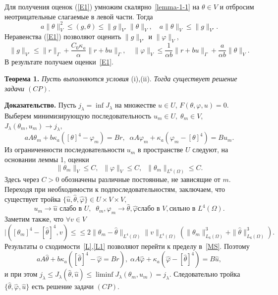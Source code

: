 \documentclass[12pt]{article}
\begin{document}
    Для получения оценок (\ref{E1}) умножим скалярно~\eqref{lemma-1-1} на $\theta \in V$ и отбросим неотрицательные
    слагаемые в левой части.
    Тогда
    $$
    a \|\theta\|^2_V \leq (g, \theta) \leq \|g\|_{V'}\|\theta\|_V,
    \quad a\|\theta\|_V \leq \|g\|_{V'}.
    $$
    Неравенства (\ref{E1}) позволяют оценить $\|g\|_{V'}$ и $\|\varphi\|_V $,
    $$
    \|g\|_{V'} \leq \|r\|_\Gamma + \frac{C_0\kappa_a}{\alpha}\|r + bu\|_\Gamma, \quad
    \|\varphi\|_V \leq \frac{1}{\alpha b} \|r + bu\|_\Gamma + \frac{a}{\alpha b} \|\theta\|_V.
    $$
    В результате получаем оценки~\eqref{E1}.

    \textbf{Теорема 1.}
    {\it
    Пусть выполняются условия} (i),(ii).
        {\it Тогда существует решение задачи $(CP).$
    }

        {\bf Доказательство.}
    Пусть $j_\lambda = \inf J_\lambda$ на множестве $u \in U$, $F(\theta, \varphi, u)=0.$
    Выберем минимизирующую последовательность
    $u_m \in U, \; \theta_m \in V$, $J_\lambda(\theta_m, u_m)
    \rightarrow j_\lambda,$
    \begin{equation}
        \label{MS}
        a A \theta_m +b \kappa_a([\theta]^4 - \varphi_m) = Br, \;\;
        \alpha A \varphi_m + \kappa_a (\varphi_m - [\theta]^4) = B u_m.
    \end{equation}
    Из ограниченности последовательности $u_m$ в пространстве $U$ следуют, на основании
    леммы 1, оценки
    $$
    \|\theta_m\|_V \leq C,\;\;
    \|\varphi\|_V \leq C,\;\;\|\theta_m\|_{L^6(\Omega)} \leq C.
    $$
    Здесь через $C>0$ обозначены различные постоянные, не зависящие от $m$.
    Переходя при необходимости к подпоследовательностям, заключаем, что
    существует тройка $\{ \hat{u}, \hat{\theta}, \hat{\varphi} \} \in U \times V \times V,$
    \begin{equation}
        \label{L}
        u_m \rightarrow \hat{u} \text{  слабо в } U, \;\;
        \theta_m, \varphi_m \rightarrow \hat{\theta}, \hat{\varphi} \text{
            слабо в } V, \text{
            сильно в } L^4(\Omega).
    \end{equation}
    Заметим также, что $\forall v \in V$
    \begin{equation}
        \label{L1}
        |( [\theta_m]^4 - [\hat{\theta}]^4, v) \leq
        \leq 2 \| \theta_m - \hat{\theta}\|_{L^4(\Omega)} \|v\|_{L^4(\Omega)}
        \left( \| \theta_m \|^3_{L_6(\Omega)} + \| \hat{\theta} \|^3_{L_6(\Omega)}\right).
    \end{equation}
    Результаты о сходимости~\eqref{L},\eqref{L1} позволяют перейти
    к пределу в~\eqref{MS}.
    Поэтому
    \[
        a A \hat{\theta} + b \kappa_a ([\hat{\theta}]^4 - \hat{\varphi} = Br), \;
        \alpha A \hat{\varphi} + \kappa_a (\hat{\varphi} -[\hat{\theta}]^4) = B \hat{u},
    \]
    и при этом $j_\lambda \leq J_\lambda(\hat{\theta}, \hat{u}) \leq \liminf J_\lambda(\theta_m, u_m) =
    j_\lambda$.
    Следовательно тройка $\{\hat{\theta}, \hat{\varphi}, \hat{u} \}$ есть
    решение задачи $(CP).$
\end{document}
